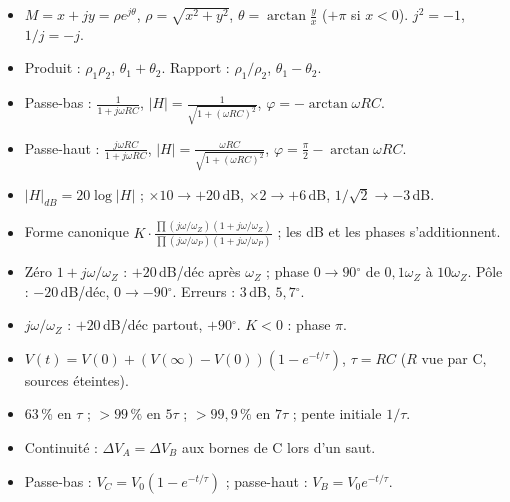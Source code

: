 \begin{thmbox}[title={Complexes et filtres (C04)}]
\begin{itemize}
  \item $M = x + jy = \rho e^{j\theta}$, $\rho = \sqrt{x^2 + y^2}$,
        $\theta = \arctan\frac{y}{x}$ ($+\pi$ si $x<0$). $j^2 = -1$, $1/j = -j$.
  \item Produit : $\rho_1\rho_2$, $\theta_1 + \theta_2$. Rapport : $\rho_1/\rho_2$,
        $\theta_1 - \theta_2$.
  \item Passe-bas : $\frac1{1 + j\omega RC}$, $|H| = \frac1{\sqrt{1 + (\omega RC)^2}}$,
        $\varphi = -\arctan\omega RC$.
  \item Passe-haut : $\frac{j\omega RC}{1 + j\omega RC}$, $|H| = \frac{\omega RC}{\sqrt{1 + (\omega RC)^2}}$,
        $\varphi = \frac\pi2 - \arctan\omega RC$.
\end{itemize}
\end{thmbox}

\begin{thmbox}[title={Bode (C05)}]
\begin{itemize}
  \item $|H|_{dB} = 20\log|H|$ ; $\times10\to+20$\,dB, $\times2\to+6$\,dB,
        $1/\sqrt2\to-3$\,dB.
  \item Forme canonique $K\cdot\frac{\prod(j\omega/\omega_Z)(1 + j\omega/\omega_Z)}{\prod(j\omega/\omega_P)(1 + j\omega/\omega_P)}$ ;
        les dB et les phases s'additionnent.
  \item Zéro $1 + j\omega/\omega_Z$ : $+20$\,dB/déc après $\omega_Z$ ; phase $0\to90\ensuremath{^\circ}$ de
        $0{,}1\omega_Z$ à $10\omega_Z$. Pôle : $-20$\,dB/déc, $0\to-90\ensuremath{^\circ}$. Erreurs : 3\,dB,
        $5{,}7\ensuremath{^\circ}$.
  \item $j\omega/\omega_Z$ : $+20$\,dB/déc partout, $+90\ensuremath{^\circ}$. $K<0$ : phase $\pi$.
\end{itemize}
\end{thmbox}

\begin{thmbox}[title={Impulsions (C06)}]
\begin{itemize}
  \item $V(t) = V(0) + (V(\infty) - V(0))\left(1 - e^{-t/\tau}\right)$, $\tau = RC$ ($R$ vue
        par C, sources éteintes).
  \item 63\,\% en $\tau$ ; $>99\,\%$ en $5\tau$ ; $>99{,}9\,\%$ en $7\tau$ ; pente initiale
        $1/\tau$.
  \item Continuité : $\Delta V_A = \Delta V_B$ aux bornes de C lors d'un saut.
  \item Passe-bas : $V_C = V_0(1 - e^{-t/\tau})$ ; passe-haut : $V_B = V_0e^{-t/\tau}$.
\end{itemize}
\end{thmbox}

